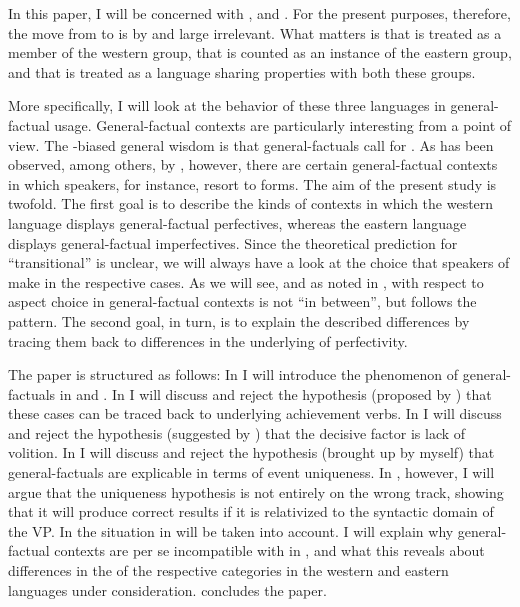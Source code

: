 \documentclass[output=paper,modfonts,newtxmath,hidelinks]{langscibook}
\begin{document}
In this paper, I will be concerned with ,  and . 
For the present purposes, therefore, the move from \citet{Dickey2000} to \citet{Dickey15} is by and large irrelevant. 
What matters is that  is treated as a member of 
the western group, that  is counted as an instance of the eastern group, 
and that  is treated as a language sharing properties with both these groups.

More specifically, I will look at the  behavior of these three languages in general-factual usage.
General-factual contexts are particularly interesting from a  point of view.
The -biased general wisdom is that general-factuals call for . As has been observed, among others, by \citet{Dickey2000}, however, 
there are certain general-factual contexts in which  speakers, for instance, resort to  forms.  
The aim of the present study is twofold. The first goal is to describe the kinds of contexts in which the western language  displays general-factual perfectives, whereas 
the eastern language  displays general-factual imperfectives. Since the theoretical prediction for ``transitional''  is unclear, 
we will always have a look at the choice that speakers of  
make in the respective cases. As we will see, and as noted in 
\citet[101]{Dickey2000}, with respect to aspect choice in general-factual contexts  is not ``in between'', but 
follows the  pattern.  
The second goal, in turn, is to explain the described differences by tracing them back to differences in the underlying 
 of perfectivity. 

The paper is structured as follows: 
In  I will introduce the phenomenon of  general-factuals in  and . 
In  I will discuss and reject the hypothesis (proposed by \citealt{Dickey2000}) that these cases can be traced back to underlying achievement verbs. 
In  I will discuss and reject the hypothesis (suggested by \citealt{Cummins1987}) that the decisive factor is lack of volition. 
In  I will discuss and reject the hypothesis (brought up by myself) that  general-factuals are explicable in terms of event uniqueness.
In , however, I will argue that the uniqueness hypothesis is not entirely on the wrong track, showing that 
it will produce correct results if it is relativized to the syntactic domain of the VP.
In  the situation in  will be taken into account. I will explain why general-factual contexts are per se incompatible
with  in , and what this reveals about differences in the  of the respective  categories
in the western and eastern  languages under consideration. 
 concludes the paper. 
\end{document}
